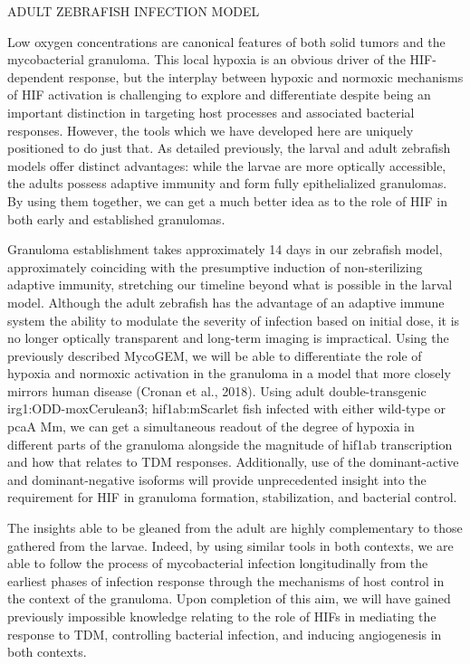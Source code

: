 ADULT ZEBRAFISH INFECTION MODEL

Low oxygen concentrations are canonical features of both solid tumors and the mycobacterial granuloma. This local hypoxia is an obvious driver of the HIF-dependent response, but the interplay between hypoxic and normoxic mechanisms of HIF activation is challenging to explore and differentiate despite being an important distinction in targeting host processes and associated bacterial responses. However, the tools which we have developed here are uniquely positioned to do just that. As detailed previously, the larval and adult zebrafish models offer distinct advantages: while the larvae are more optically accessible, the adults possess adaptive immunity and form fully epithelialized granulomas. By using them together, we can get a much better idea as to the role of HIF in both early and established granulomas. 

Granuloma establishment takes approximately 14 days in our zebrafish model, approximately coinciding with the presumptive induction of non-sterilizing adaptive immunity, stretching our timeline beyond what is possible in the larval model. Although the adult zebrafish has the advantage of an adaptive immune system the ability to modulate the severity of infection based on initial dose, it is no longer optically transparent and long-term imaging is impractical. Using the previously described MycoGEM, we will be able to differentiate the role of hypoxia and normoxic activation in the granuloma in a model that more closely mirrors human disease (Cronan et al., 2018). Using adult double-transgenic irg1:ODD-moxCerulean3; hif1ab:mScarlet fish infected with either wild-type or pcaA Mm, we can get a simultaneous readout of the degree of hypoxia in different parts of the granuloma alongside the magnitude of hif1ab transcription and how that relates to TDM responses. Additionally, use of the dominant-active and dominant-negative isoforms will provide unprecedented insight into the requirement for HIF in granuloma formation, stabilization, and bacterial control. 

The insights able to be gleaned from the adult are highly complementary to those gathered from the larvae. Indeed, by using similar tools in both contexts, we are able to follow the process of mycobacterial infection longitudinally from the earliest phases of infection response through the mechanisms of host control in the context of the granuloma. Upon completion of this aim, we will have gained previously impossible knowledge relating to the role of HIFs in mediating the response to TDM, controlling bacterial infection, and inducing angiogenesis in both contexts.

